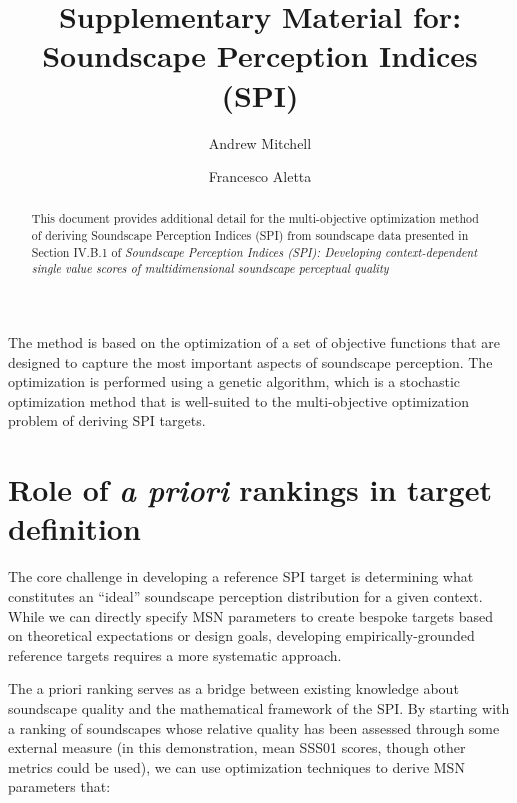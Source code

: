 \documentclass[
  authoryear,
  preprint,
  3p]{elsarticle}
\begin{document}
\begin{frontmatter}
\title{Supplementary Material for: Soundscape Perception Indices (SPI)}
\author[1]{Andrew Mitchell%
%
}
\author[1]{Francesco Aletta%
%
}




        
\begin{abstract}
This document provides additional detail for the multi-objective
optimization method of deriving Soundscape Perception Indices (SPI) from
soundscape data presented in Section IV.B.1 of \emph{Soundscape
Perception Indices (SPI): Developing context-dependent single value
scores of multidimensional soundscape perceptual quality}
\end{abstract}





\end{frontmatter}
    

The method is based on the optimization of a set of objective functions
that are designed to capture the most important aspects of soundscape
perception. The optimization is performed using a genetic algorithm,
which is a stochastic optimization method that is well-suited to the
multi-objective optimization problem of deriving SPI targets.

\section{\texorpdfstring{Role of \emph{a priori} rankings in target
definition}{Role of a priori rankings in target definition}}\label{role-of-a-priori-rankings-in-target-definition}

The core challenge in developing a reference SPI target is determining
what constitutes an ``ideal'' soundscape perception distribution for a
given context. While we can directly specify MSN parameters to create
bespoke targets based on theoretical expectations or design goals,
developing empirically-grounded reference targets requires a more
systematic approach.

The a priori ranking serves as a bridge between existing knowledge about
soundscape quality and the mathematical framework of the SPI. By
starting with a ranking of soundscapes whose relative quality has been
assessed through some external measure (in this demonstration, mean
SSS01 scores, though other metrics could be used), we can use
optimization techniques to derive MSN parameters that:
\end{document}
